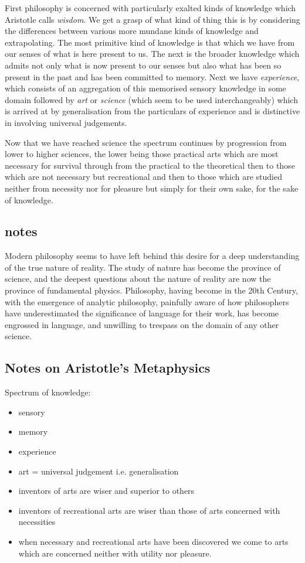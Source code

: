 \documentclass{rbjk}
\begin{document}
\begin{article}
First philosophy is concerned with particularly exalted kinds of knowledge which Aristotle calls {\it wisdom}.
We get a grasp of what kind of thing this is by considering the differences between various more mundane kinds of knowledge and extrapolating.
The most primitive kind of knowledge is that which we have from our senses of what is here present to us.
The next is the broader knowledge which admits not only what is now present to our senses but also what has been so present in the past and has been committed to memory.
Next we have {\it experience}, which consists of an aggregation of this memorised sensory knowledge in some domain followed by {\it art} or {\it science} (which seem to be used interchangeably) which is arrived at by generalisation from the particulars of experience and is distinctive in involving universal judgements.

Now that we have reached science the spectrum continues by progression from lower to higher sciences, the lower being those practical arts which are most necessary for survival through from the practical to the theoretical then to those which are not necessary but recreational and then to those which are studied neither from necessity nor for pleasure but simply for their own sake, for the sake of knowledge.

\subsection{notes}

Modern philosophy seems to have left behind this desire for a deep understanding of the true nature of reality.
The study of nature has become the province of science, and the deepest questions about the nature of reality are now the province of fundamental physics.
Philosophy, having become in the 20th Century, with the emergence of analytic philosophy, painfully aware of how philosophers have underestimated the significance of language for their work, has become engrossed in language, and unwilling to trespass on the domain of any other science.

\subsection{Notes on Aristotle's Metaphysics}

Spectrum of knowledge:
\begin{itemize}
\item sensory
\item memory
\item experience
\item art = universal judgement i.e. generalisation
\item inventors of arts are wiser and superior to others
\item inventors of recreational arts are wiser than those of arts concerned with necessities
\item when necessary and recreational arts have been discovered we come to arts which are concerned neither with utility nor pleasure.
\end{itemize}


\end{article}
\end{document}
